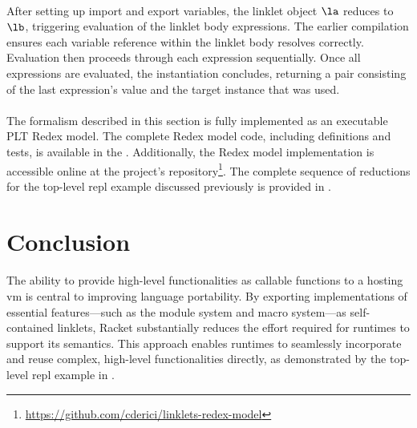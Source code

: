 		\paragraph{}%
			After setting up import and export variables, the linklet object $\la$ reduces to $\lb$, triggering evaluation of the linklet body expressions. The earlier compilation ensures each variable reference within the linklet body resolves correctly. Evaluation then proceeds through each expression sequentially. Once all expressions are evaluated, the instantiation concludes, returning a pair consisting of the last expression's value and the target instance that was used.

		\paragraph{}%
			The formalism described in this section is fully implemented as an executable PLT Redex model. The complete Redex model code, including definitions and tests, is available in the . Additionally, the Redex model implementation is accessible online at the project's repository\footnote{\url{https://github.com/cderici/linklets-redex-model}}. The complete sequence of reductions for the top-level \gls{repl} example discussed previously is provided in .

	\section*{\thesection\quad Conclusion}

		\paragraph{}%
			The ability to provide high-level functionalities as callable functions to a hosting \gls{vm} is central to improving language portability. By exporting implementations of essential features—such as the module system and macro system—as self-contained linklets, Racket substantially reduces the effort required for runtimes to support its semantics. This approach enables runtimes to seamlessly incorporate and reuse complex, high-level functionalities directly, as demonstrated by the top-level \gls{repl} example in .


